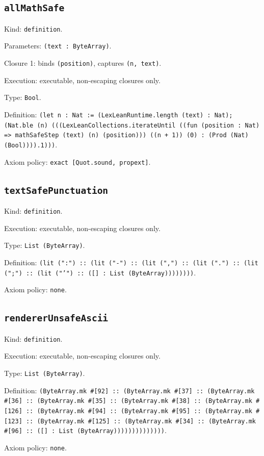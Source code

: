\documentclass[11pt]{article}
\begin{document}
\subsection*{\texttt{allMathSafe}}
\noindent Kind: \texttt{definition}.\par
\noindent Parameters: \texttt{(text : ByteArray)}.\par
\noindent Closure 1: binds \texttt{(position)}, captures \texttt{(n, text)}.\par
\noindent Execution: executable, non-escaping closures only.\par
\noindent Type: \texttt{Bool}.\par
\noindent Definition: \texttt{(let n : Nat := (LexLeanRuntime.length (text) : Nat); (Nat.ble (n) (((LexLeanCollections.iterateUntil ((fun (position : Nat) => mathSafeStep (text) (n) (position))) ((n + 1)) (0) : (Prod (Nat) (Bool)))).1)))}.\par
\noindent Axiom policy: \texttt{exact [Quot.sound, propext]}.\par
\subsection*{\texttt{textSafePunctuation}}
\noindent Kind: \texttt{definition}.\par
\noindent Execution: executable, non-escaping closures only.\par
\noindent Type: \texttt{List (ByteArray)}.\par
\noindent Definition: \texttt{(lit (":") :: (lit ("-") :: (lit (",") :: (lit (".") :: (lit (";") :: (lit ("'") :: ([] : List (ByteArray))))))))}.\par
\noindent Axiom policy: \texttt{none}.\par
\subsection*{\texttt{rendererUnsafeAscii}}
\noindent Kind: \texttt{definition}.\par
\noindent Execution: executable, non-escaping closures only.\par
\noindent Type: \texttt{List (ByteArray)}.\par
\noindent Definition: \texttt{(ByteArray.mk \#[92] :: (ByteArray.mk \#[37] :: (ByteArray.mk \#[36] :: (ByteArray.mk \#[35] :: (ByteArray.mk \#[38] :: (ByteArray.mk \#[126] :: (ByteArray.mk \#[94] :: (ByteArray.mk \#[95] :: (ByteArray.mk \#[123] :: (ByteArray.mk \#[125] :: (ByteArray.mk \#[34] :: (ByteArray.mk \#[96] :: ([] : List (ByteArray))))))))))))))}.\par
\noindent Axiom policy: \texttt{none}.\par
\end{document}
